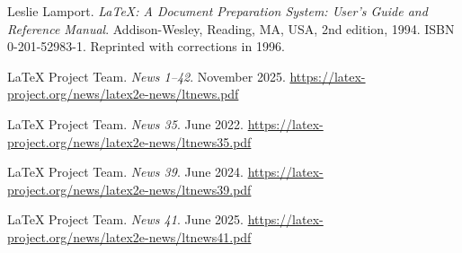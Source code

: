 \documentclass{ltnews}
\begin{document}
\begin{thebibliography}{9}\frenchspacing


Leslie Lamport.
\newblock \emph{{\LaTeX}: {A} Document Preparation System: User's Guide and Reference
  Manual}.
\newblock \mbox{Addison}-Wesley, Reading, MA, USA, 2nd edition, 1994.
\newblock ISBN 0-201-52983-1.
\newblock Reprinted with corrections in 1996.

 \LaTeX{} Project Team.
  \emph{\LaTeXe{} News 1--42}. November 2025.
  \url{https://latex-project.org/news/latex2e-news/ltnews.pdf}

 \LaTeX{} Project Team.
  \emph{\LaTeXe{} News 35}. June 2022.
  \url{https://latex-project.org/news/latex2e-news/ltnews35.pdf}

 \LaTeX{} Project Team.
  \emph{\LaTeXe{} News 39}. June 2024.
  \url{https://latex-project.org/news/latex2e-news/ltnews39.pdf}

 \LaTeX{} Project Team.
  \emph{\LaTeXe{} News 41}. June 2025.
  \url{https://latex-project.org/news/latex2e-news/ltnews41.pdf}

\end{thebibliography}
\end{document}
